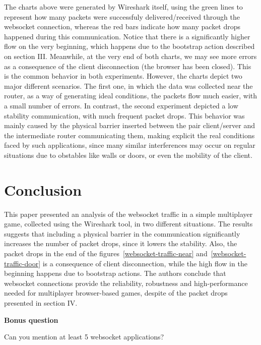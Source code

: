 \documentclass[english]{sbrt}
\begin{document}
The charts above were generated by Wireshark itself, using the green lines to represent
how many packets were successfuly delivered/received through the websocket connection, whereas the
red bars indicate how many packet drops happened during this communication. Notice that there is a significantly
higher flow on the very beginning, which happens due to the bootstrap action described on section III. Meanwhile, at the very end
of both charts, we may see more errors as a consequence of the client disconnection (the browser has been closed). This is the common
behavior in both experiments. However, the charts depict two major different scenarios. The first one, in which the data was collected near
the router, as a way of generating ideal conditions, the packets flow much easier, with a small number of errors. In contrast, the second experiment
depicted a low stability communication, with much frequent packet drops. This behavior was mainly caused by the physical barrier inserted between the pair client/server
and the intermediate router communicating them, making explicit the real conditions faced by such applications, since many similar interferences may occur on regular situations
due to obstables like walls or doors, or even the mobility of the client.

\section{\textbf{Conclusion}}
This paper presented an analysis of the websocket traffic in a simple multiplayer game, collected using the Wireshark tool, in two different situations. The results suggests that including a physical barrier in the communication significantly increases the number of packet drops, since it lowers the stability. Also, the packet drops in the end of the figures~\ref{websocket-traffic-near} and~\ref{websocket-traffic-door} is a consequence of client disconnection, while the high flow in the beginning happens due to bootstrap actions. The authors conclude that websocket connections provide the reliability, robustness and high-performance needed for multiplayer browser-based games, despite of the packet drops presented in section IV.




\textbf{Bonus question}

Can you mention at least 5 websocket applications?
\end{document}
